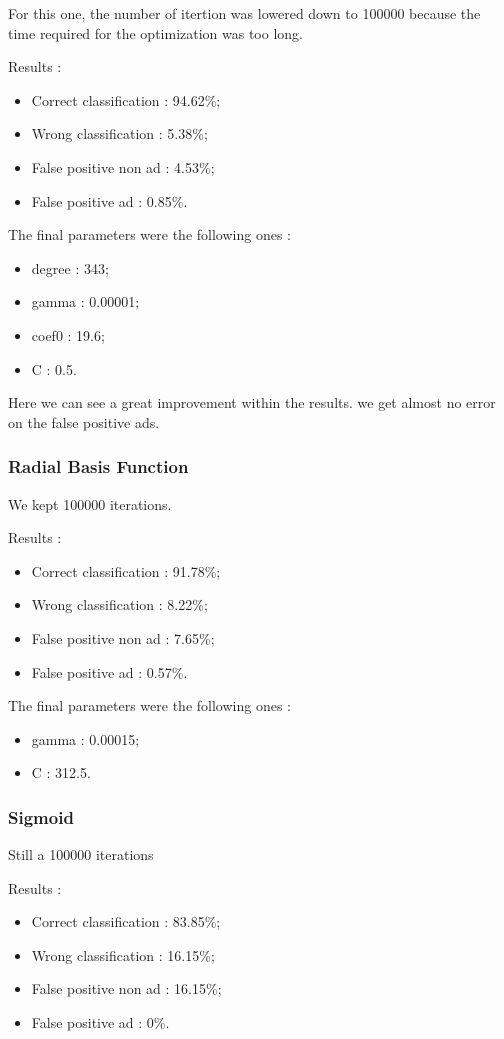 For this one, the number of itertion was lowered down to 100000 because the time required for the optimization was too long.

Results :
\begin{itemize}
  \item Correct classification : 94.62\%;
  \item Wrong classification : 5.38\%;
  \item False positive non ad : 4.53\%;
  \item False positive ad : 0.85\%.
\end{itemize}

The final parameters were the following ones :
\begin{itemize}
  \item degree : 343;
  \item gamma : 0.00001;
  \item coef0 : 19.6;
  \item C : 0.5.
\end{itemize}

Here we can see a great improvement within the results. we get almost no error on the false positive ads.
\subsubsection{Radial Basis Function}

We kept 100000 iterations.

Results :
\begin{itemize}
  \item Correct classification : 91.78\%;
  \item Wrong classification : 8.22\%;
  \item False positive non ad : 7.65\%;
  \item False positive ad : 0.57\%.
\end{itemize}

The final parameters were the following ones :
\begin{itemize}
  \item gamma : 0.00015;
  \item C : 312.5.
\end{itemize}


\subsubsection{Sigmoid}

Still a 100000 iterations

Results :
\begin{itemize}
  \item Correct classification : 83.85\%;
  \item Wrong classification : 16.15\%;
  \item False positive non ad : 16.15\%;
  \item False positive ad : 0\%.
\end{itemize}

